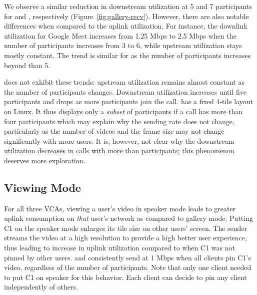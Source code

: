 We observe a similar reduction in downstream utilization at 5 and 7
participants for \zoom and \meet, respectively
(Figure~\ref{fig:gallery-recv}). However, there are also notable differences
when compared to the uplink utilization. For instance, the downlink
utilization for Google Meet increases from 1.25 Mbps to 2.5 Mbps when the
number of participants increases from 3 to 6, while upstream utilization stays
mostly constant. The trend is similar for \zoom as the number of participants
increases beyond than 5. 

\teams does not exhibit these trends: upstream utilization remains almost
constant as the number of participants changes. Downstream utilization
increases until five participants and drops as more participants join the call.
\teams has a fixed 4-tile layout on Linux. It thus displays
only a {\em subset} of participants if a call has more than four participants
which
may explain why the sending rate does not change, particularly as the number
of videos and the frame size may not
change significantly with more users. It is, however, not clear why the
downstream utilization decreases in calls with more than participants; this
phenomenon deserves more exploration. 

\subsection{Viewing Mode}

For all three VCAs, viewing a user's video in speaker mode leads to greater
uplink consumption on {\em that} user's network as compared to gallery mode.
Putting C1 on the speaker mode enlarges its tile size on other users' screen.
The sender streams the video at a high resolution to provide a high better user experience,
thus leading to increase in uplink utilization compared to when C1
was not pinned by other users. \zoom and \meet consistently send at 1 Mbps
when all clients pin C1's video, regardless of the number of participants.
Note that only one client needed to put C1 on speaker for this behavior. Each
client can decide to pin any client independently of others.

